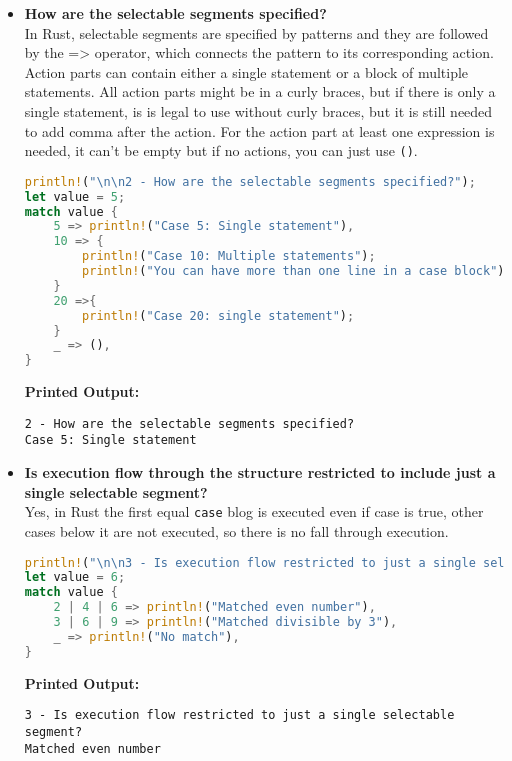 \documentclass{article}
\begin{document}
\begin{itemize}
\item \textbf{How are the selectable segments specified?} \\
In Rust, selectable segments are specified by patterns and they are followed by the => operator, which connects the pattern to its corresponding action. Action parts can contain either a single statement or a block of multiple statements. All action parts might be in a curly braces, but if there is only a single statement, is is legal to use without curly braces, but it is still needed to add comma after the action. For the action part at least one expression is needed, it can't be empty but if no actions, you can just use \texttt{()}.
\begin{lstlisting}[language=Rust]
println!("\n\n2 - How are the selectable segments specified?");
let value = 5;
match value {
    5 => println!("Case 5: Single statement"),
    10 => {
        println!("Case 10: Multiple statements");
        println!("You can have more than one line in a case block");
    }
    20 =>{
        println!("Case 20: single statement");
    }
    _ => (),
}
\end{lstlisting}
\textbf{Printed Output:} \begin{verbatim}
2 - How are the selectable segments specified?
Case 5: Single statement
\end{verbatim}

\item \textbf{Is execution flow through the structure restricted to include just a single selectable segment?} \\
Yes, in Rust the first equal \texttt{case} blog is executed even if case is true, other cases below it are not executed, so there is no fall through execution. 
\begin{lstlisting}[language=Rust]
println!("\n\n3 - Is execution flow restricted to just a single selectable segment?");
let value = 6;
match value {
    2 | 4 | 6 => println!("Matched even number"),
    3 | 6 | 9 => println!("Matched divisible by 3"),
    _ => println!("No match"),
}
\end{lstlisting}
\textbf{Printed Output:} \begin{verbatim}
3 - Is execution flow restricted to just a single selectable segment?
Matched even number
\end{verbatim}




\end{itemize}
\end{document}

